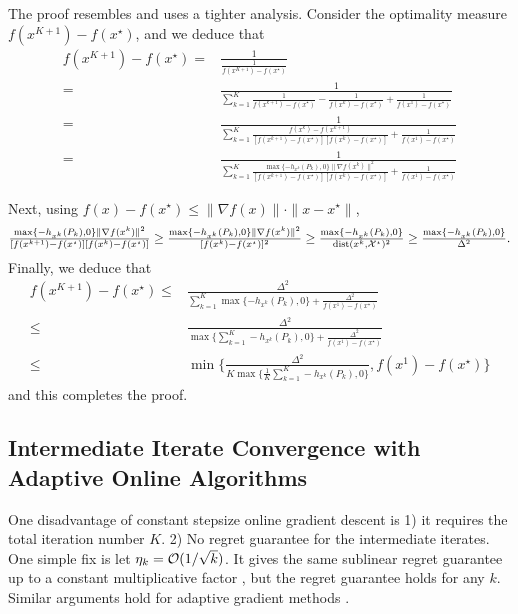 The proof resembles \cite{gao2024gradient} and uses a tighter analysis.
Consider the optimality measure $f (x^{K + 1}) - f (x^{\star})$, and we deduce that
\begin{align}
  f (x^{K + 1}) - f (x^{\star}) ={} & \frac{1}{\frac{1}{f (x^{K + 1}) - f
  (x^{\star})}} \nonumber\\
  ={} & \frac{1}{\sum_{k = 1}^K \frac{1}{f (x^{k + 1}) - f (x^{\star})} -
  \frac{1}{f (x^k) - f (x^{\star})} + \frac{1}{f (x^1) - f (x^{\star})}}
  \nonumber\\
  ={} & \frac{1}{\sum_{k = 1}^K \frac{f (x^k) - f (x^{k + 1})}{[f (x^{k + 1}) -
  f (x^{\star})] [f (x^k) - f (x^{\star})]} + \frac{1}{f (x^1) - f
  (x^{\star})}} \nonumber\\
  ={} & \frac{1}{\sum_{k = 1}^K \frac{\max \{ - h_{x^k} (P_k), 0 \} \| \nabla f
  (x^k) \|^2}{[f (x^{k + 1}) - f (x^{\star})] [f (x^k) - f (x^{\star})]} +
  \frac{1}{f (x^1) - f (x^{\star})}} \nonumber
\end{align}

Next, using $f (x) - f (x^{\star}) \leq \| \nabla f (x) \| \cdot \| x -
x^{\star} \|$,
\[ \tfrac{\max \{ - h_{x^k} (P_k), 0 \} \| \nabla f (x^k) \|^2}{[f (x^{k + 1})
   - f (x^{\star})] [f (x^k) - f (x^{\star})]} \geq \tfrac{\max \{ - h_{x^k}
   (P_k), 0 \} \| \nabla f (x^k) \|^2}{[f (x^k) - f (x^{\star})]^2} \geq
   \tfrac{\max \{ - h_{x^k} (P_k), 0 \}}{\mathrm{dist} (x^k,
   \mathcal{X}^{\star})^2} \geq \tfrac{\max \{ - h_{x^k} (P_k), 0
   \}}{\Delta^2}. \]
Finally, we deduce that
\begin{align}
  f (x^{K + 1}) - f (x^{\star}) \leq{} & \tfrac{\Delta^2}{\sum_{k = 1}^K \max \{
  - h_{x^k} (P_k), 0 \} + \tfrac{\Delta^2}{f (x^1) - f (x^{\star})}}
  \nonumber\\
  \leq{} & \tfrac{\Delta^2}{\max \{ \sum_{k = 1}^K - h_{x^k} (P_k), 0
  \} + \frac{\Delta^2}{f (x^1) - f (x^{\star})}} \nonumber\\
  \leq{} & \min \Big\{ \tfrac{\Delta^2}{K \max \{ \frac{1}{K} \sum_{k =
  1}^K - h_{x^k} (P_k), 0 \}}, f (x^1) - f (x^{\star}) \Big\}
  \nonumber
\end{align}
and this completes the proof.

\subsection{Intermediate Iterate Convergence with Adaptive Online Algorithms} \label{sec:intermediate-iter}

One disadvantage of constant stepsize online gradient descent is 1) it requires the total iteration number $K$. 2) No regret guarantee for the intermediate iterates. One simple fix is let $\eta_k = \mathcal{O}(1/\sqrt{k})$. It gives the same sublinear regret guarantee up to a constant multiplicative factor \cite{orabona2019modern}, but the regret guarantee holds for any $k$. Similar arguments hold for adaptive gradient methods \cite{duchi2011adaptive,mcmahan2010adaptive}.


